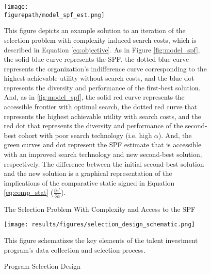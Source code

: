     \newpage
    \begin{figure}[!htb]
    \centering
        \caption{The Selection Problem With Complexity and Access to the SPF}\label{fig:model_spf_est}
      \texttt{[image: \\figurepath/model\_spf\_est.png]} 
        \begin{notes}
    This figure depicts an example solution to an iteration of the selection problem with complexity induced search costs, which is described in Equation \ref{eq:objective}. As in Figure \ref{fig:model_spf}, the solid blue curve represents the SPF, the dotted blue curve represents the organization's indifference curve corresponding to the highest achievable utility without search costs, and the blue dot represents the diversity and performance of the first-best solution. And, as in \ref{fig:model_spf}, the solid red curve represents the accessible frontier with optimal search, the dotted red curve that represents the highest achievable utility with search costs, and the red dot that represents the diversity and performance of the second-best cohort with poor search technology (i.e. high $\alpha$). And, the green curves and dot represent the SPF estimate that is accessible with an improved search technology and new second-best solution, respectively. The difference between the initial second-best solution and the new solution is a graphical representation of the implications of the comparative static signed in Equation \ref{eq:comp_stat} ($\frac{\partial e^*}{\partial \alpha}$).
        \end{notes}
    \end{figure}
    
    
    \newpage
    \null %
    \vfill
    \begin{center}
    \begin{figure}[!htb]
    \centering
        \caption{Program Selection Design}\label{fig:design}
      \texttt{[image: results/figures/selection\_design\_schematic.png]} 
        \begin{notes}
        This figure schematizes the key elements of the talent investment program's data collection and selection process. 
        \end{notes}
    \end{figure}
    \end{center}
    \vfill
    
